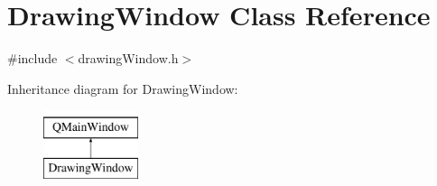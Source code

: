 \hypertarget{class_drawing_window}{}\section{Drawing\+Window Class Reference}
\label{class_drawing_window}


{\ttfamily \#include $<$drawing\+Window.\+h$>$}

Inheritance diagram for Drawing\+Window\+:\begin{figure}[H]
\begin{center}
\leavevmode
\includegraphics[height=2.000000cm]{class_drawing_window}
\end{center}
\end{figure}

